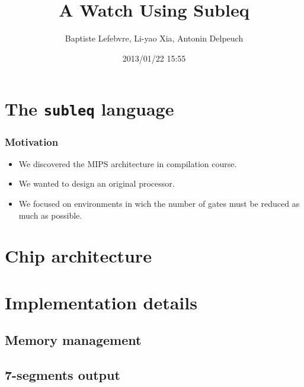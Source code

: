 \documentclass[slidestop]{beamer}
\begin{document}
\makeatletter

\title{A Watch Using Subleq}
\author{Baptiste Lefebvre, Li-yao Xia, Antonin Delpeuch}
\date{2013/01/22 15:55}

\section{The \texttt{subleq} language}

\begin{frame}
    \frametitle{Motivation}

    \begin{itemize}
        \item We discovered the MIPS architecture in compilation course.
        \item We wanted to design an original processor.
        \item We focused on environments in wich the number of gates must be reduced as much as possible.
    \end{itemize}

\end{frame}


\section{Chip architecture}

\section{Implementation details}

\subsection{Memory management}

\subsection{7-segments output}
\end{document}
